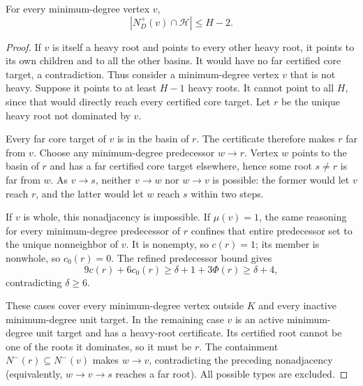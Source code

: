 \begin{lemma}
\label{lem:minimum-heavy-capacity}
For every minimum-degree vertex $v$,
\[
 {|N_D^+(v)\cap\mathcal H|\le H-2.}
\]
\end{lemma}
\begin{proof}
If $v$ is itself a heavy root and points to every other heavy
root, it points to its own children and to all the other basins.
It would have no far certified core target, a contradiction.
Thus consider a minimum-degree vertex $v$ that is not heavy.
Suppose it points to at least $H-1$ heavy roots.
It cannot point to all $H$, since that would directly reach every
certified core target.  Let $r$ be the unique heavy root not
dominated by $v$.

Every far core target of $v$ is in the basin of $r$.
The certificate therefore makes $r$ far from $v$.
Choose any minimum-degree predecessor $w\to r$.
Vertex $w$ points to the basin of $r$ and has a far certified
core target elsewhere, hence some root $s\ne r$ is far from $w$.
As $v\to s$, neither $v\to w$ nor $w\to v$ is possible: the
former would let $v$ reach $r$, and the latter would let $w$
reach $s$ within two steps.

If $v$ is whole, this nonadjacency is impossible.
If $\mu(v)=1$, the same reasoning for every minimum-degree
predecessor of $r$ confines that entire predecessor set to the
unique nonneighbor of $v$.  It is nonempty, so $c(r)=1$;
its member is nonwhole, so $c_0(r)=0$.
The refined predecessor bound gives
\[
 9c(r)+6c_0(r)\ge\delta+1+3\Phi(r)\ge\delta+4,
\]
contradicting $\delta\ge6$.

These cases cover every minimum-degree vertex outside $K$ and
every inactive minimum-degree unit target.
In the remaining case $v$ is an active minimum-degree unit
target and has a heavy-root certificate.  Its certified root
cannot be one of the roots it dominates, so it must be $r$.
The containment $N^-(r)\subseteq N^-(v)$ makes $w\to v$,
contradicting the preceding nonadjacency (equivalently,
$w\to v\to s$ reaches a far root).
All possible types are excluded.
\end{proof}

